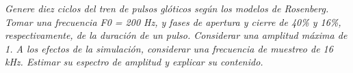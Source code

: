 


\textit{Genere diez ciclos del tren de pulsos glóticos según los modelos de Rosenberg. Tomar una
frecuencia F0 = 200 Hz, y fases de apertura y cierre de 40\% y 16\%, respectivamente, de la
duración de un pulso. Considerar una amplitud máxima de 1. A los efectos de la simulación,
considerar una frecuencia de muestreo de 16 kHz. Estimar su espectro de amplitud y explicar su
contenido.}

